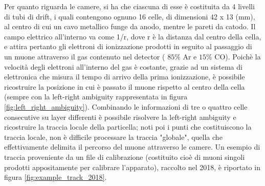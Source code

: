 \documentclass[a4paper,11pt]{book}
\begin{document}
Per quanto riguarda le camere, si ha che ciascuna di esse è costituita da 4 livelli di tubi di drift, i quali contengono ognuno 16 celle, di dimensioni 42 x 13 (mm), al centro di cui un cavo metallico funge da anodo, mentre le pareti da catodo. Il campo elettrico all'interno va come 1/r, dove r è la distanza dal centro della cella, e attira pertanto gli elettroni di ionizzazione prodotti in seguito al passaggio di un muone attraverso il gas contenuto nel detector ( $85\%$ Ar e $15\%$ CO). Poichè la velocità degli elettroni all'interno del gas è costante, grazie ad un sistema di elettronica che misura il tempo di arrivo della prima ionizzazione, è possibile ricostruire la posizione in cui è passato il muone rispetto al centro della cella (sempre con la left-right ambiguity rappresentata in figura \ref{fig:left_right_ambiguity}). Combinando le informazioni di tre o quattro celle consecutive su layer differenti è possibile risolvere la left-right ambiguity e ricostruire la traccia locale della particella; noti poi i punti che costituiscono la traccia locale, non è difficile processare la traccia "globale", quella che effettivamente delimita il percorso del muone attraverso le camere. Un esempio di traccia proveniente da un file di calibrazione (costituito cioè di muoni singoli prodotti appositamente per calibrare l'apparato), raccolto nel 2018, è riportato in figura \ref{fig:example_track_2018}.\\
\end{document}
